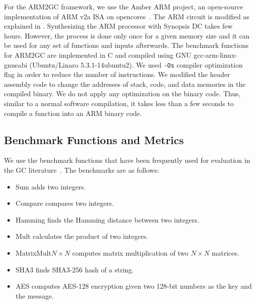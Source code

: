 For the ARM2GC framework, we use the Amber ARM project, an open-source implementation of ARM v2a ISA on opencores~\cite{santifort2010amber}.
The ARM circuit is modified as explained in .
Synthesizing the ARM processor with Synopsis DC takes few hours.
However, the process is done only once for a given memory size and it can be used for any set of functions and inputs afterwards.
The benchmark functions for ARM2GC are implemented in C and compiled using GNU gcc-arm-linux-gnueabi (Ubuntu/Linaro 5.3.1-14ubuntu2).
We used \texttt{-Os} compiler optimization flag in order to reduce the number of instructions.
We modified the header assembly code to change the addresses of stack, code, and data memories in the compiled binary.
We do not apply any optimization on the binary code.
Thus, similar to a normal software compilation, it takes less than a few seconds to compile a function into an ARM binary code.

\subsection{Benchmark Functions and Metrics}
We use the benchmark functions that have been frequently used for evaluation in the GC literature~\cite{holzer2012secure, songhori2015tinygarble, wang2016secure}. The benchmarks are as follows:

\begin{itemize}
\vspace{-0.06in}
\item Sum adds two integers.
\vspace{-0.1in}
\item Compare compares two integers.
\vspace{-0.1in}
\item Hamming finds the Hamming distance between two integers.
\vspace{-0.1in}
\item Mult calculates the product of two integers.
\vspace{-0.1in}
\item MatrixMult$N\times N$ computes matrix multiplication of two $N\times N$ matrices.
\vspace{-0.1in}
\item SHA3 finds SHA3-256 hash of a string.
\vspace{-0.1in}
\item AES computes AES-128 encryption given two 128-bit numbers as the key and the message.
\end{itemize}


